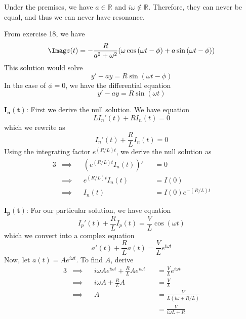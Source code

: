 \documentclass[a4paper]{article}
\begin{document}

Under the premises, we have \(a \in \mathbb{R}\) and \(i \omega \not\in\mathbb{R}\). Therefore, they can never be equal, and thus we can never have resonance.

\vspace{12pt}


From exercise 18, we have
\[
	\Imag z \!\left( t \right) = -\frac{R}{a^{2} + \omega^{2}} \!\left( \omega \cos\left( \omega t - \phi  \right) + a \sin\left( \omega t - \phi  \right) \right) 
\]
This solution would solve
\[
	y' - ay = R \sin\left( \omega t - \phi  \right)
\]
In the case of \(\phi = 0\), we have the differential equation
\[
	y' - ay = R \sin\left( \omega t \right)
\]


\(\bm{I_{n} \!\left( t \right) }\): First we derive the null solution. We have equation
\[
	LI_{n}' \!\left( t \right) + RI_{n} \!\left( t \right)  = 0
\]
which we rewrite as
\[
	I_{n}'\!\left( t \right)  + \frac{R}{L}I_{n} \!\left( t \right)  = 0
\]
Using the integrating factor \(e^{\!\left( R/L \right) t}\), we derive the null solution as
\begin{alignat*}{3}
	&\implies && \!\left( e^{\!\left( R/L \right) t} I_{n} \!\left( t \right)  \right)' && = 0 \\
	&\implies && e^{\!\left( R/L \right) t} I_{n} \!\left( t \right) && = I \!\left( 0 \right)   \\
	&\implies && I_{n} \!\left( t \right) && = I \!\left( 0 \right) e^{-\!\left( R/L \right) t}
\end{alignat*}

\(\bm{I_{p} \!\left( t \right) }\): For our particular solution, we have equation
\[
	I_{p}' \!\left( t \right) + \frac{R}{L} I_{p} \!\left( t \right) = \frac{V}{L} \cos\left( \omega t \right)
\]
which we convert into a complex equation
\[
	a' \!\left( t \right) + \frac{R}{L} a \!\left( t \right) = \frac{V}{L} e^{i \omega t}
\]
Now, let \(a \!\left( t \right) = A e^{i \omega t}\). To find \(A\), derive
\begin{alignat*}{3}
	&\implies && i \omega A e^{i \omega t} + \frac{R}{L} A e^{i \omega t} && = \frac{V}{L} e^{i \omega t} \\
	&\implies && i \omega A + \frac{R}{L}A && = \frac{V}{L} \\ 
	&\implies && A && = \frac{V}{L \!\left( i \omega + R/L \right) } \\
	& && && = \frac{V}{i \omega L + R}
\end{alignat*}
\end{document}
